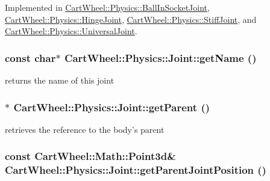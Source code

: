 Implemented in \hyperlink{classCartWheel_1_1Physics_1_1BallInSocketJoint_a8d42a8e2cd4e5b84b951411aa6344721}{CartWheel::Physics::BallInSocketJoint}, \hyperlink{classCartWheel_1_1Physics_1_1HingeJoint_ac235a55558abc285ec5bc3bd19e3a2da}{CartWheel::Physics::HingeJoint}, \hyperlink{classCartWheel_1_1Physics_1_1StiffJoint_acc1db8ea3775d137500c15daf8921766}{CartWheel::Physics::StiffJoint}, and \hyperlink{classCartWheel_1_1Physics_1_1UniversalJoint_afd2448f6efafb3e09049209e56c55996}{CartWheel::Physics::UniversalJoint}.

\hypertarget{classCartWheel_1_1Physics_1_1Joint_a69b2e2a04082adbcd2163a4856435eb6}{
\subsubsection[{getName}]{\setlength{\rightskip}{0pt plus 5cm}const char$\ast$ CartWheel::Physics::Joint::getName ()}}
\label{classCartWheel_1_1Physics_1_1Joint_a69b2e2a04082adbcd2163a4856435eb6}
returns the name of this joint \hypertarget{classCartWheel_1_1Physics_1_1Joint_acea937f59d890c8609b24b05e48324e8}{
\subsubsection[{getParent}]{$\ast$ CartWheel::Physics::Joint::getParent ()}}
\label{classCartWheel_1_1Physics_1_1Joint_acea937f59d890c8609b24b05e48324e8}
retrieves the reference to the body's parent \hypertarget{classCartWheel_1_1Physics_1_1Joint_ac0365213bd8aab8af0db718c87e63fd9}{
\subsubsection[{getParentJointPosition}]{\setlength{\rightskip}{0pt plus 5cm}const {\bf CartWheel::Math::Point3d}\& CartWheel::Physics::Joint::getParentJointPosition ()}}
